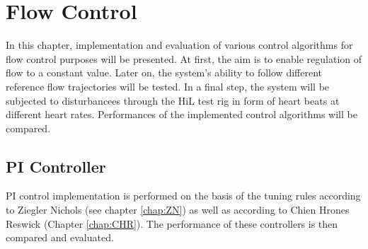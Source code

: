 \chapter{Flow Control}
In this chapter, implementation and evaluation of various control algorithms for flow control purposes will be presented. At first, the aim is to enable regulation of flow to a constant value. Later on, the system's ability to follow different reference flow trajectories will be tested. In a final step, the system will be subjected to disturbancees through the HiL test rig in form of heart beats at different heart rates. Performances of the implemented control algorithms will be compared.
\section{PI Controller}
PI control implementation is performed on the basis of the tuning rules according to Ziegler Nichols (see chapter \ref{chap:ZN}) as well as according to Chien Hrones Reswick (Chapter \ref{chap:CHR}). The performance of these controllers is then compared and evaluated.
